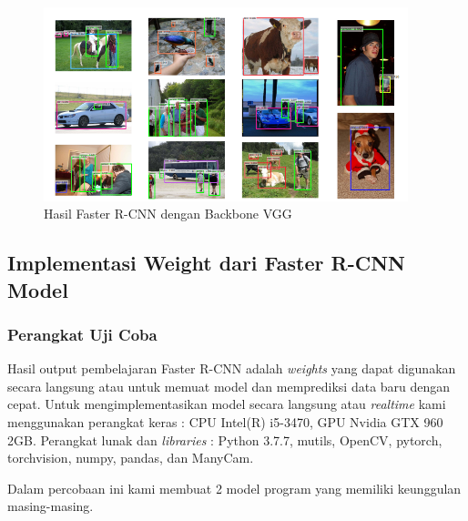 \documentclass{article}
\begin{document}
   	\begin{figure}[H]
   		\centering
   		\includegraphics[width=400px]{arsitektur/contoh_hasil.png}
   		\caption{Hasil Faster R-CNN dengan Backbone VGG}
   	\end{figure}
   	
   	\newpage
  	\subsection{Implementasi Weight dari Faster R-CNN Model}
  	\subsubsection{Perangkat Uji Coba}
	\par Hasil output pembelajaran Faster R-CNN adalah \textit{weights} yang dapat digunakan secara langsung atau untuk memuat model dan memprediksi data baru dengan cepat. Untuk mengimplementasikan model secara langsung atau \textit{realtime} kami menggunakan perangkat keras : CPU Intel(R) i5-3470, GPU Nvidia GTX 960 2GB. Perangkat lunak dan \textit{libraries} : Python 3.7.7, mutils, OpenCV, pytorch, torchvision, numpy, pandas, dan ManyCam. 
	
	\par Dalam percobaan ini kami membuat 2 model program yang memiliki keunggulan masing-masing.
\end{document}
